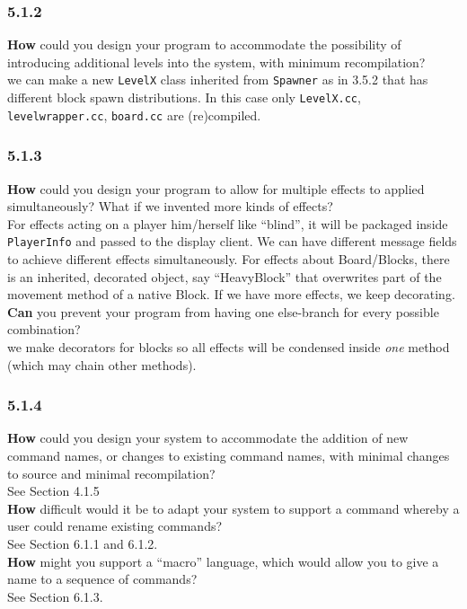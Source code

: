 \documentclass[
]{article}
\begin{document}
\hypertarget{section-1}{%
\subsubsection{5.1.2}\label{section-1}}

\textbf{How} could you design your program to accommodate the
possibility of introducing additional levels into the system, with
minimum recompilation?\\
we can make a new \texttt{LevelX} class inherited from \texttt{Spawner}
as in 3.5.2 that has different block spawn distributions. In this case
only \texttt{LevelX.cc}, \texttt{levelwrapper.cc}, \texttt{board.cc} are
(re)compiled.

\hypertarget{section-2}{%
\subsubsection{5.1.3}\label{section-2}}

\textbf{How} could you design your program to allow for multiple effects
to applied simultaneously? What if we invented more kinds of effects?\\
For effects acting on a player him/herself like ``blind'', it will be
packaged inside \texttt{PlayerInfo} and passed to the display client. We
can have different message fields to achieve different effects
simultaneously. For effects about Board/Blocks, there is an inherited,
decorated object, say ``HeavyBlock'' that overwrites part of the
movement method of a native Block. If we have more effects, we keep
decorating.\\
\textbf{Can} you prevent your program from having one else-branch for
every possible combination?\\
we make decorators for blocks so all effects will be condensed inside
\emph{one} method (which may chain other methods).

\hypertarget{section-3}{%
\subsubsection{5.1.4}\label{section-3}}

\textbf{How} could you design your system to accommodate the addition of
new command names, or changes to existing command names, with minimal
changes to source and minimal recompilation?\\
See Section 4.1.5\\
\textbf{How} difficult would it be to adapt your system to support a
command whereby a user could rename existing commands?\\
See Section 6.1.1 and 6.1.2.\\
\textbf{How} might you support a ``macro'' language, which would allow
you to give a name to a sequence of commands?\\
See Section 6.1.3.
\end{document}
